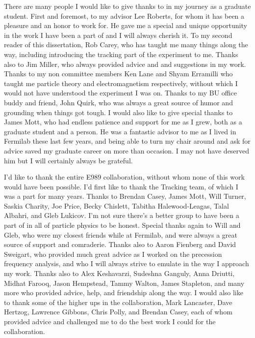 

There are many people I would like to give thanks to in my journey as a graduate student. First and foremost, to my advisor Lee Roberts, for whom it has been a pleasure and an honor to work for. He gave me a special and unique opportunity in the work I have been a part of and I will always cherish it. To my second reader of this dissertation, Rob Carey, who has taught me many things along the way, including introducing the tracking part of the experiment to me. Thanks also to Jim Miller, who always provided advice and and suggestions in my work. Thanks to my non \gmtwo committee members Ken Lane and Shyam Erramilli who taught me particle theory and electromagnetism respectively, without which I would not have understood the experiment I was on. Thanks to my BU office buddy and friend, John Quirk, who was always a great source of humor and grounding when things got tough. I would also like to give special thanks to James Mott, who had endless patience and support for me as I grew, both as a graduate student and a person. He was a fantastic advisor to me as I lived in Fermilab these last few years, and being able to turn my chair around and ask for advice saved my graduate career on more than occasion. I may not have deserved him but I will certainly always be grateful.


I'd like to thank the entire E989 collaboration, without whom none of this work would have been possible. I'd first like to thank the Tracking team, of which I was a part for many years. Thanks to Brendan Casey, James Mott, Will Turner, Saskia Charity, Joe Price, Becky Chislett, Tabitha Halewood-Leagas, Talal Albahri, and Gleb Lukicov. I'm not sure there's a better group to have been a part of in all of particle physics to be honest. Special thanks again to Will and Gleb, who were my closest friends while at Fermilab, and were always a great source of support and comraderie. Thanks also to Aaron Fienberg and David Sweigart, who provided much great advice as I worked on the precession frequency analysis, and who I will always strive to emulate in the way I approach my work. Thanks also to Alex Keshavarzi, Sudeshna Ganguly, Anna Driutti, Midhat Farooq, Jason Hempstead, Tammy Walton, James Stapleton, and many more who provided advice, help, and friendship along the way. I would also like to thank some of the higher ups in the collaboration, Mark Lancaster, Dave Hertzog, Lawrence Gibbons, Chris Polly, and Brendan Casey, each of whom provided advice and challenged me to do the best work I could for the collaboration.


